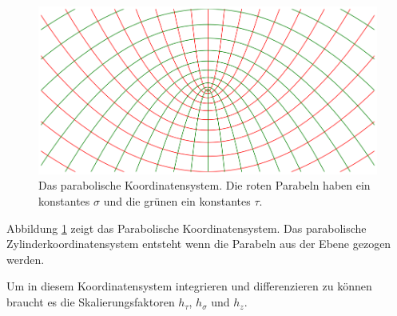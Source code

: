 \begin{figure}
    \centering
    \includegraphics[scale=0.4]{papers/parzyl/img/koordinaten.png}
    \caption{Das parabolische Koordinatensystem. Die roten Parabeln haben ein 
    konstantes $\sigma$ und die grünen ein konstantes $\tau$.}
    \label{parzyl:fig:cordinates}
\end{figure}
Abbildung \ref{parzyl:fig:cordinates} zeigt das Parabolische Koordinatensystem.
Das parabolische Zylinderkoordinatensystem entsteht wenn die Parabeln aus der
Ebene gezogen werden. 

Um in diesem Koordinatensystem integrieren und differenzieren zu 
können braucht es die Skalierungsfaktoren $h_{\tau}$, $h_{\sigma}$ und $h_{z}$.

